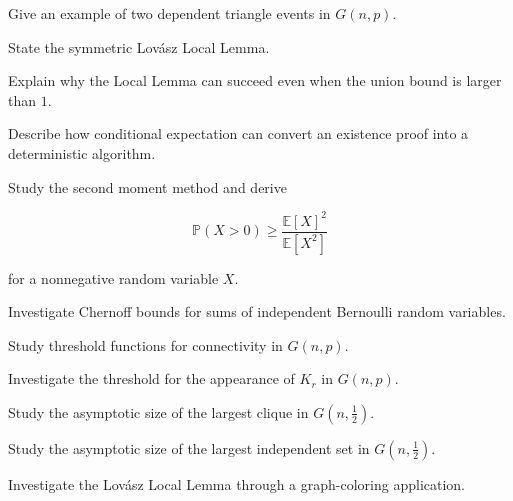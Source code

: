 \begin{exercise}[3]
Give an example of two dependent triangle events in \(G(n,p)\).
\end{exercise}

\begin{exercise}[3]
State the symmetric Lov\'asz Local Lemma.
\end{exercise}

\begin{exercise}[3]
Explain why the Local Lemma can succeed even when the union bound is
larger than \(1\).
\end{exercise}

\begin{exercise}[3]
Describe how conditional expectation can convert an existence proof
into a deterministic algorithm.
\end{exercise}

\begin{exercise}[4]
Study the second moment method and derive

\[
\mathbb{P}(X>0)
\geq
\frac{\mathbb{E}[X]^2}{\mathbb{E}[X^2]}
\]

for a nonnegative random variable \(X\).
\end{exercise}

\begin{exercise}[4]
Investigate Chernoff bounds for sums of independent Bernoulli random
variables.
\end{exercise}

\begin{exercise}[4]
Study threshold functions for connectivity in \(G(n,p)\).
\end{exercise}

\begin{exercise}[4]
Investigate the threshold for the appearance of \(K_r\) in \(G(n,p)\).
\end{exercise}

\begin{exercise}[4]
Study the asymptotic size of the largest clique in \(G(n,\tfrac12)\).
\end{exercise}

\begin{exercise}[4]
Study the asymptotic size of the largest independent set in
\(G(n,\tfrac12)\).
\end{exercise}

\begin{exercise}[4]
Investigate the Lov\'asz Local Lemma through a graph-coloring
application.
\end{exercise}

